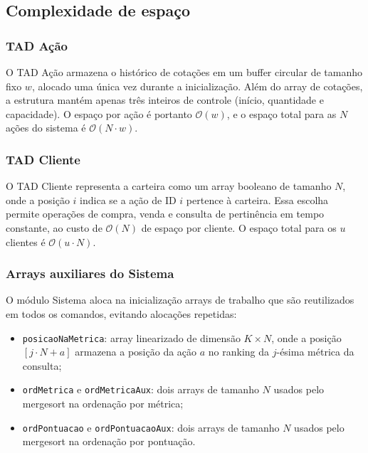 \documentclass[12pt,a4paper]{article}
\begin{document}
\subsection{Complexidade de espaço}

\subsubsection*{TAD Ação}

O TAD Ação armazena o histórico de cotações em um buffer circular de tamanho fixo $w$, alocado uma única vez durante a inicialização. Além do array de cotações, a estrutura mantém apenas três inteiros de controle (início, quantidade e capacidade). O espaço por ação é portanto $\mathcal{O}(w)$, e o espaço total para as $N$ ações do sistema é $\mathcal{O}(N \cdot w)$.

\subsubsection*{TAD Cliente}

O TAD Cliente representa a carteira como um array booleano de tamanho $N$, onde a posição $i$ indica se a ação de ID $i$ pertence à carteira. Essa escolha permite operações de compra, venda e consulta de pertinência em tempo constante, ao custo de $\mathcal{O}(N)$ de espaço por cliente. O espaço total para os $u$ clientes é $\mathcal{O}(u \cdot N)$.

\subsubsection*{Arrays auxiliares do Sistema}

O módulo Sistema aloca na inicialização arrays de trabalho que são reutilizados em todos os comandos, evitando alocações repetidas:

\begin{itemize}
    \item \texttt{posicaoNaMetrica}: array linearizado de dimensão $K \times N$, onde a posição $[j \cdot N + a]$ armazena a posição da ação $a$ no ranking da $j$-ésima métrica da consulta;
    \item \texttt{ordMetrica} e \texttt{ordMetricaAux}: dois arrays de tamanho $N$ usados pelo mergesort na ordenação por métrica;
    \item \texttt{ordPontuacao} e \texttt{ordPontuacaoAux}: dois arrays de tamanho $N$ usados pelo mergesort na ordenação por pontuação.
\end{itemize}
\end{document}
